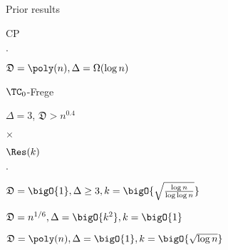 \begin{frame}{Prior results}
    \vspace{0.3cm}
    \pause
    \begin{minipage}{0.2\linewidth}
        CP
    \end{minipage}
    \begin{minipage}{0.25\linewidth}
        \centering
        $\cdot$
    \end{minipage}
    \begin{minipage}{0.53\linewidth}
        \centering
        $\mathfrak{D} = \poly(n), \Delta = \Omega(\log n)$
    \end{minipage}

    \vspace{0.3cm}
    \pause
    \begin{minipage}{0.2\linewidth}
        $\TC_0$-Frege
    \end{minipage}
    \begin{minipage}{0.25\linewidth}
        \centering
        $\Delta = 3$, $\mathfrak{D} > n^{0.4}$
    \end{minipage}
    \begin{minipage}{0.53\linewidth}
        \centering
        \alert{$\times$}
    \end{minipage}

    \vspace{0.3cm}
    \pause
    \begin{minipage}{0.2\linewidth}
        $\Res(k)$
    \end{minipage}
    \begin{minipage}{0.25\linewidth}
        \centering
        $\cdot$
    \end{minipage}
    \begin{minipage}{0.53\linewidth}
        \centering
        $\mathfrak{D} = \bigO{1}, \Delta \ge 3, k = \bigO{\sqrt{\frac{\log n}{\log\log n}}}$
        
        $\mathfrak{D} = n^{1 / 6}, \Delta = \bigO{k^2}, k = \bigO{1}$

        \pause
        \alert{$\mathfrak{D} = \poly(n), \Delta = \bigO{1}, k = \bigO{\sqrt{\log n}}$}
    \end{minipage}
    

\end{frame}

